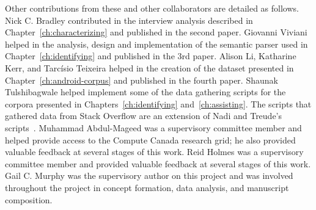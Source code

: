 Other contributions from these and other collaborators are detailed as follows.
Nick C. Bradley contributed in
the interview analysis described in Chapter~\ref{ch:characterizing} and published in the second paper.
Giovanni Viviani helped in the analysis, design and implementation of the 
semantic parser used in Chapter~\ref{ch:identifying} and published in the 3rd paper.
Alison Li, Katharine Kerr, and Tarc{\'i}sio Teixeira helped 
in the creation of the dataset presented in Chapter~\ref{ch:android-corpus} and published in the fourth paper.
Shaunak Tulshibagwale helped implement some of the 
data gathering scripts for the 
corpora presented in Chapters~\ref{ch:identifying} and~\ref{ch:assisting}.
The scripts that gathered data from Stack Overflow are an extension of 
 Nadi and Treude's scripts~\cite{nadi2019Rep}.
Muhammad Abdul-Mageed was a supervisory committee member and helped provide access to the 
Compute Canada research grid; he also provided valuable feedback  at several stages of this work. 
Reid Holmes was a supervisory committee member and provided valuable feedback at several stages of this work. 
Gail C. Murphy was the supervisory author on this project
and was involved throughout the project in concept formation, data analysis, and
manuscript composition.

